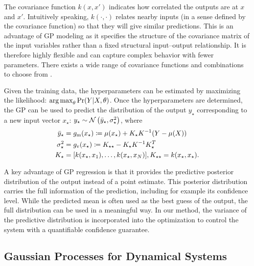 The covariance function \(k(x,x')\) indicates how correlated the outputs are at \(x\) and \(x'\).
Intuitively speaking,  \(k(\cdot, \cdot)\) relates nearby inputs (in a sense defined by the covariance function) so that they will give similar predictions. 
This is an advantage of GP modeling as it specifies the structure of the covariance matrix of the input variables rather than a fixed structural input--output relationship.
It is therefore highly flexible and can capture complex behavior with fewer parameters.
There exists a wide range of covariance functions and combinations to choose from \cite{rasmussen06gaussian}. 

Given the training data, the hyperparameters can be estimated by maximizing the likelihood: \(\operatorname*{arg\,max}_\theta \Pr(Y \vert X, \theta)\).
Once the hyperparameters are determined, the GP can be used to predict the distribution of the output \(y_\star\) corresponding to a new input vector \(x_\star\): \(y_\star \sim \operatorname*{\mathcal{N}}\left(\bar{y}_\star, \sigma_\star^2\right)\), where
\begin{subequations}
\label{eq:gp-regression}
\begin{align}
\bar{y}_\star &= g_{\mathrm{m}} (x_{\star}) \coloneqq \mu(x_\star) + K_\star K^{-1} (Y - \mu(X))\\
\sigma_\star^2 &= g_{\mathrm{v}} (x_{\star}) \coloneqq K_{\star \star} - K_\star K^{-1} K_\star^T\\
K_\star &= [k(x_\star, x_1), \dots, k(x_\star, x_N)], K_{\star \star} = k(x_\star, x_\star) \text.
\end{align}
\end{subequations}

A key advantage of GP regression is that it provides the predictive posterior distribution of the output instead of a point estimate.
This posterior distribution carries the full information of the prediction, including for example its confidence level.
While the predicted mean is often used as the best guess of the output, the full distribution can be used in a meaningful way.
In our method, the variance of the predictive distribution is incorporated into the optimization to control the system with a quantifiable confidence guarantee.


\subsection{Gaussian Processes for Dynamical Systems}
\label{sec:intro-gp:control}

